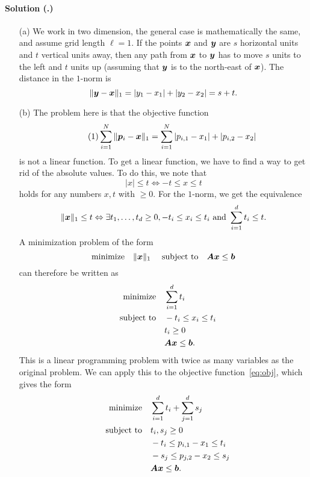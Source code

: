 \documentclass{article}
\newcounter{problemSheetNumber}
\newcounter{problems}
\renewcommand{\solution}[1]{\paragraph{Solution (\theproblemSheetNumber.\theproblems)}\addtocounter{problems}{1}\label{#1}}
\begin{document}
\solution{pr6} 
\begin{itemize}
 \item[(a)] We work in two dimension, the general case is mathematically the same, and assume grid length $\ell=1$. If the points $\bm{x}$ and $\bm{y}$ are $s$ horizontal units and $t$ vertical units away, then any path from $\bm{x}$ to $\bm{y}$ has to move $s$ units to the left and $t$ units up (assuming that $\bm{y}$ is to the north-east of $\bm{x}$). The distance in the $1$-norm is
 \begin{equation*}
  \Vert {\bm{y}-\bm{x}}\Vert_1 = |y_1-x_1|+|y_2-x_2| = s+t. 
 \end{equation*}
 \item[(b)] The problem here is that the objective function
 \begin{equation}\label{eq:obj}\tag{1}
  \sum_{i=1}^N\Vert {\bm{p}_i-\bm{x}}\Vert_1 = \sum_{i=1}^N|p_{i,1}-x_1|+|p_{i,2}-x_2|
 \end{equation}
 is not a linear function. To get a linear function, we have to find a way to get rid of the absolute values. To do this, we note that
 \begin{equation*}
  |x|\leq t \Leftrightarrow -t\leq x\leq t
 \end{equation*}
holds for any numbers $x,t$ with $\geq 0$. For the $1$-norm, we get the equivalence
\begin{equation*}
 \Vert {\bm{x}}\Vert_1 \leq t \Leftrightarrow \exists t_1,\dots,t_d\geq 0, -t_i\leq x_i\leq t_i \text{ and } \sum_{i=1}^d t_i\leq t.
\end{equation*}
A minimization problem of the form
\begin{equation*}
 \minimize \norm{\vct{x}}_1 \ \subjto \mtx{A}\vct{x}\leq \vct{b}
\end{equation*}
can therefore be written as
\begin{align*}
 \text{minimize}\quad &\sum_{i=1}^d t_i\\
 \quad\text{subject to}\quad & -t_i\leq x_i \leq t_i\\
 &t_i\geq 0\\
 & \bm{A}\bm{x}\leq \bm{b}.
\end{align*}
This is a linear programming problem with twice as many variables as the original problem. We can apply this to the objective function~\eqref{eq:obj}, which gives the form
\begin{align*}
 \text{minimize}\quad & \sum_{i=1}^d t_i+\sum_{j=1}^d s_j\\
 \quad\text{subject to}\quad & t_i, s_j\geq 0\\
 & -t_i\leq p_{i,1}-x_1\leq t_i\\
 & -s_j\leq p_{j,2}-x_2\leq s_j\\
 & \bm{A}\bm{x}\leq \bm{b}.
\end{align*}

\end{itemize}

 
\end{document}
